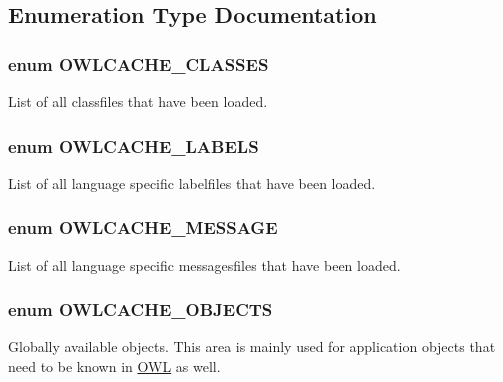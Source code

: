 \subsection{Enumeration Type Documentation}
\subsubsection[{OWLCACHE\_\-CLASSES}]{\setlength{\rightskip}{0pt plus 5cm}enum {\bf OWLCACHE\_\-CLASSES}}\label{class_8cache_8php_abb193d72fe0ccf2933265e1a4ed44871}


List of all classfiles that have been loaded. 

\subsubsection[{OWLCACHE\_\-LABELS}]{\setlength{\rightskip}{0pt plus 5cm}enum {\bf OWLCACHE\_\-LABELS}}\label{class_8cache_8php_ad4a4a5cbb5f8ee148e301224fdc229f2}


List of all language specific labelfiles that have been loaded. 

\subsubsection[{OWLCACHE\_\-MESSAGE}]{\setlength{\rightskip}{0pt plus 5cm}enum {\bf OWLCACHE\_\-MESSAGE}}\label{class_8cache_8php_ae55be4307f9104de754eb3da6d94ee17}


List of all language specific messagesfiles that have been loaded. 

\subsubsection[{OWLCACHE\_\-OBJECTS}]{\setlength{\rightskip}{0pt plus 5cm}enum {\bf OWLCACHE\_\-OBJECTS}}\label{class_8cache_8php_a071ce1f57cd4c167c013a8ad61ed1456}


Globally available objects. This area is mainly used for application objects that need to be known in \hyperlink{classOWL}{OWL} as well. 


